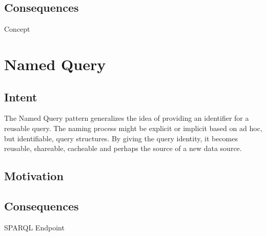 \subsection{Consequences}
\label{ch01.sec.4.consequences}

Concept

\newpage
\section{Named Query}
\label{ch01.sec.5}

\subsection{Intent}
\label{ch01.sec.5.intent}
The Named Query pattern generalizes the idea of providing an identifier for a reusable query. The naming process might be explicit or implicit based on ad hoc, but identifiable, query structures. By giving the query identity, it becomes reusable, shareable, cacheable and perhaps the source of a new data source.

\subsection{Motivation}
\label{ch01.sec.5.motivation}

\subsection{Consequences}
\label{ch01.sec.5.consequences}

SPARQL Endpoint

